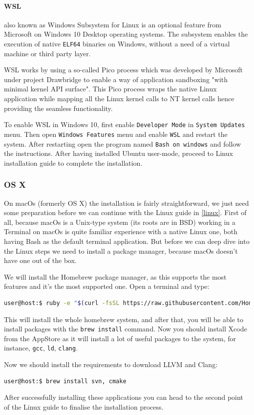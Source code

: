 \paragraph{WSL}
\par also known as Windows Subsystem for Linux is an optional feature from Microsoft on Windows 10 Desktop operating systems. The subsystem enables the execution of native \verb|ELF64| binaries\cite{wsl_overview} on Windows, without a need of a virtual machine or third party layer. \medskip
\par WSL works by using a so-called Pico process which was developed by Microsoft under project Drawbridge\cite{project_drawbridge} to enable a way of application sandboxing "with minimal kernel API surface"\cite{project_drawbridge}. This Pico process wraps the native Linux application while mapping all the Linux kernel calls to NT kernel calls hence providing the seamless functionality. \medskip
\par To enable WSL in Windows 10, first enable \verb|Developer Mode| in \verb|System Updates| menu. Then open \verb|Windows Features| menu and enable \verb|WSL| and restart the system. After restarting open the program named \verb|Bash on windows| and follow the instructions. After having installed Ubuntu user-mode, proceed to Linux installation guide to complete the installation.
\subsubsection{OS X}
\par On macOs (formerly OS X) the installation is fairly straightforward, we just need some preparation before we can continue with the Linux guide in \ref{linux}. First of all, because macOs is a Unix-type system (its roots are in BSD) working in a Terminal on macOs is quite familiar experience with a native Linux one, both having Bash as the default terminal application. But before we can deep dive into the Linux steps we need to install a package manager, because macOs doesn't have one out of the box.
\par We will install the Homebrew\cite{homebrew_homepage} package manager, as this supports the most features and it's the most supported one. Open a terminal and type:
\begin{lstlisting}[language=bash, frame=single]
user@host:$ ruby -e "$(curl -fsSL https://raw.githubusercontent.com/Homebrew/install/master/install)"
\end{lstlisting}
\par This will install the whole homebrew system, and after that, you will be able to install packages with the \verb|brew install| command. Now you should install Xcode from the AppStore as it will install a lot of useful packages to the system, for instance, \verb|gcc|, \verb|ld|, \verb|clang|.
\par Now we should install the requirements to download LLVM and Clang:
\begin{lstlisting}[language=bash, frame=single]
user@host:$ brew install svn, cmake
\end{lstlisting}
\par After successfully installing these applications you can head to the second point of the Linux guide to finalise the installation process.
